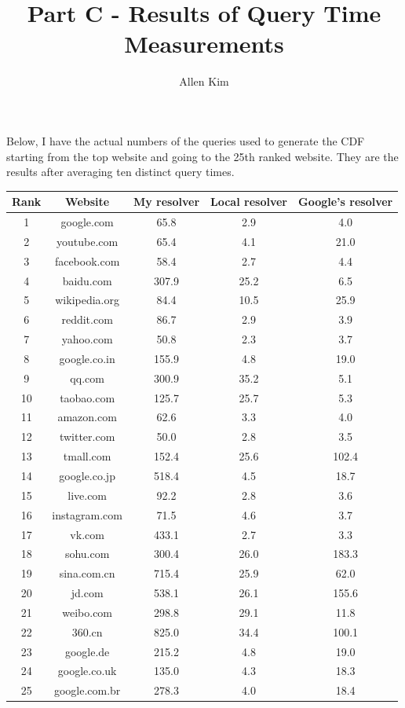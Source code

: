 \documentclass[12pt]{article}
\title{\vspace{-0.0cm}Part C - Results of Query Time Measurements}
\date{}
\author{Allen Kim}
\begin{document}
\maketitle


Below, I have the actual numbers of the queries used to generate the CDF
starting from the top website and going to the 25th ranked website. They are the results after averaging ten distinct query times.\\

\begin{tabular}{c|c|c|c|c}
Rank & Website & My resolver & Local resolver & Google's resolver \\ \hline
1 & google.com & 65.8 & 2.9 & 4.0 \\
2 & youtube.com & 65.4 & 4.1 & 21.0 \\
3 & facebook.com & 58.4 & 2.7 & 4.4 \\
4 & baidu.com & 307.9 & 25.2 & 6.5 \\
5 & wikipedia.org & 84.4 & 10.5 & 25.9 \\
6 & reddit.com & 86.7 & 2.9 & 3.9 \\
7 & yahoo.com & 50.8 & 2.3 & 3.7 \\
8 & google.co.in & 155.9 & 4.8 & 19.0 \\
9 & qq.com & 300.9 & 35.2 & 5.1 \\
10 & taobao.com & 125.7 & 25.7 & 5.3 \\
11 & amazon.com & 62.6 & 3.3 & 4.0 \\
12 & twitter.com & 50.0 & 2.8 & 3.5 \\
13 & tmall.com & 152.4 & 25.6 & 102.4 \\
14 & google.co.jp & 518.4 & 4.5 & 18.7 \\
15 & live.com & 92.2 & 2.8 & 3.6 \\
16 & instagram.com & 71.5 & 4.6 & 3.7 \\
17 & vk.com & 433.1 & 2.7 & 3.3 \\
18 & sohu.com & 300.4 & 26.0 & 183.3 \\
19 & sina.com.cn & 715.4 & 25.9 & 62.0 \\
20 & jd.com & 538.1 & 26.1 & 155.6 \\
21 & weibo.com & 298.8 & 29.1 & 11.8 \\
22 & 360.cn & 825.0 & 34.4 & 100.1 \\
23 & google.de & 215.2 & 4.8 & 19.0 \\
24 & google.co.uk & 135.0 & 4.3 & 18.3 \\
25 & google.com.br & 278.3 & 4.0 & 18.4 \\
\end{tabular}
\\
\end{document}

